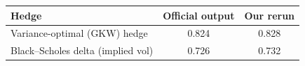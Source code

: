 \begin{tabular}{lcc}
\toprule
Hedge & Official output & Our rerun \\
\midrule
Variance-optimal (GKW) hedge & 0.824 & 0.828 \\
Black--Scholes delta (implied vol) & 0.726 & 0.732 \\
\bottomrule
\end{tabular}
